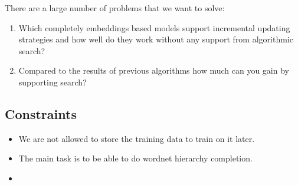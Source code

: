 \documentclass[11pt]{article}
\begin{document}
There are a large number of problems that we want to solve:

\begin{enumerate}
\item Which completely embeddings based models support incremental
  updating strategies and how well do they work without any support
  from algorithmic search?
\item Compared to the results of previous algorithms how much can you
  gain by supporting search?
\end{enumerate}

\subsection{Constraints}
\label{sec:constraints}

\begin{itemize}
\item We are not allowed to store the training data to train on it later.
\item The main task is to be able to do wordnet hierarchy completion.
\item
\end{itemize}





\end{document}

